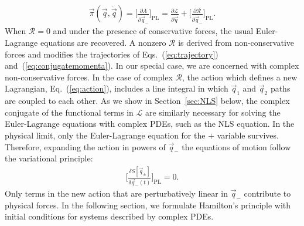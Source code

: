 \begin{align}
\vec{\pi} (\vec{q},\dot{\vec{q}}) = \Bigg[ \frac{\partial \Lambda}{\partial \dot{\vec{q}}_-} \Bigg]_{\mathrm{PL}} = \frac{\partial \mathcal{L}}{\partial \dot{\vec{q}}} + \Bigg[ \frac{\partial \mathcal{R}}{\partial \dot{\vec{q}}_-}\Bigg]_{\mathrm{PL}}. \label{eq:conjugatemomenta}
\end{align}
When $\mathcal{R} = 0$ and under the presence of conservative forces, the usual Euler-Lagrange equations are recovered.  A nonzero $\mathcal{R}$ is derived from non-conservative forces and modifies the trajectories of Eqs.~(\ref{eq:trajectory}) and~(\ref{eq:conjugatemomenta}).  In our special case, we are concerned with complex non-conservative forces.  In the case of complex $\mathcal{R}$, the action which defines a new Lagrangian, Eq.~(\ref{eq:action}), includes a line integral
in which $\vec{q}_1$ and $\vec{q}_2$ paths are coupled to each other.  As we show in Section~\ref{sec:NLS} below, the complex conjugate of the functional terms in $\mathcal{L}$ are similarly necessary for solving the Euler-Lagrange equations with complex PDEs, such as the NLS equation.  
In the physical limit, only the Euler-Lagrange equation for the $+$ variable survives.  Therefore, expanding the action in powers of $\vec{q}_-$ the equations of motion follow the variational principle:
\begin{align}
\Bigg[\frac{ \delta S[\vec{q}_{\pm}] }{\delta \vec{q}_- (t)}\Bigg]_{\mathrm{PL}} = 0.
\label{eqs}
\end{align}
Only terms in the new action that are perturbatively linear in $\vec{q}_-$ contribute to physical forces.  In the following section, we formulate Hamilton's principle with initial conditions for systems described by complex PDEs.  

